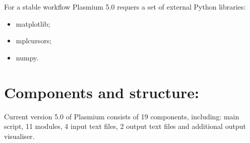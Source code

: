 \documentclass[a4paper,12pt]{article}
\begin{document}
For a stable workflow Plasmium 5.0 requers a set of external Python libraries:

\begin{itemize}
\item matplotlib;
\item mplcursors;
\item numpy.
\end{itemize}

\section{Components and structure:}

Current version 5.0 of Plasmium consists of 19 components, including: main script, 11 modules, 4 input text files, 2 output text files and additional output visualiser.
\end{document}
